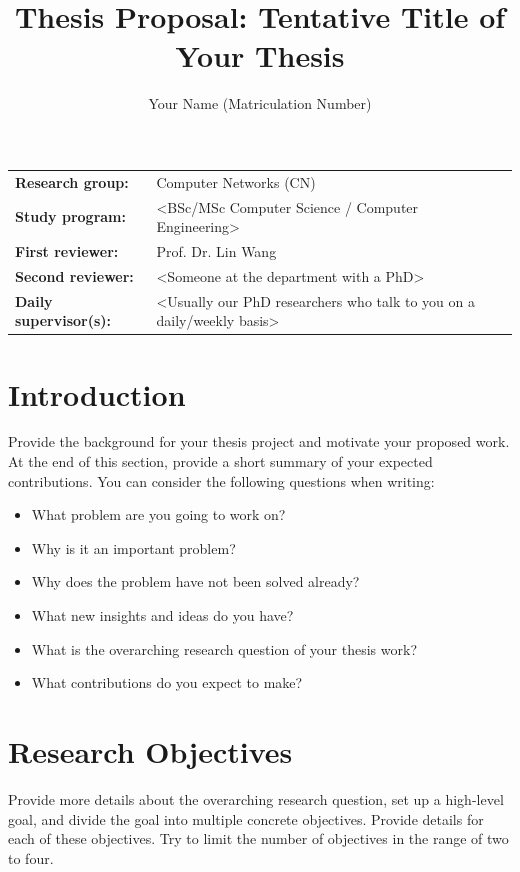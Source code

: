 \documentclass{upb-cn}
\title{Thesis Proposal: Tentative Title of Your Thesis}
\author{Your Name (Matriculation Number)}
\begin{document}
\maketitle

\begin{notebox}
    \begin{tabular}{@{}ll}
        \textbf{Research group:} & Computer Networks (CN) \\
        \textbf{Study program:} & <BSc/MSc Computer Science / Computer Engineering> \\
        \textbf{First reviewer:} & Prof. Dr. Lin Wang \\
        \textbf{Second reviewer:} & <Someone at the department with a PhD> \\
        \textbf{Daily supervisor(s):} & <Usually our PhD researchers who talk to you on a daily/weekly basis>
    \end{tabular}
\end{notebox}

\section{Introduction}
\label{sec:introduction}

Provide the background for your thesis project and motivate your proposed work. At the end of this section, provide a short summary of your expected contributions. You can consider the following questions when writing:

\begin{itemize}
    \item What problem are you going to work on?
    \item Why is it an important problem?
    \item Why does the problem have not been solved already?
    \item What new insights and ideas do you have?
    \item What is the overarching research question of your thesis work?
    \item What contributions do you expect to make? 
\end{itemize}

\section{Research Objectives}
\label{sec:objectives}

Provide more details about the overarching research question, set up a high-level goal, and divide the goal into multiple concrete objectives. Provide details for each of these objectives. Try to limit the number of objectives in the range of two to four. 
\end{document}
